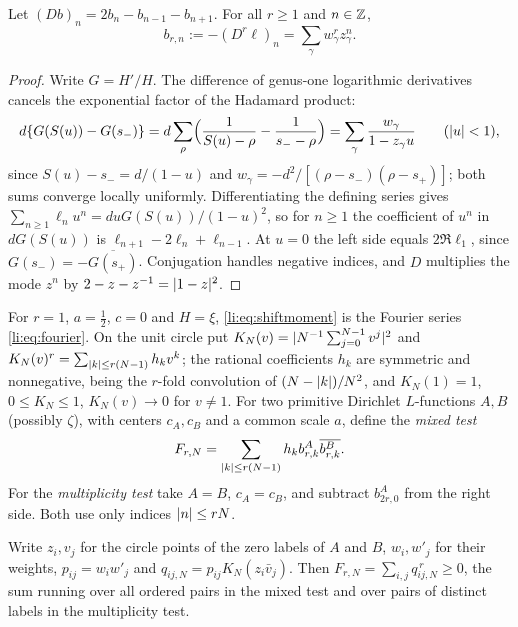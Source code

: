 \begin{lemma}\label{li:lem:shifted}
Let $(Db)_n=2b_n-b_{n-1}-b_{n+1}$. For all $r\ge1$ and $n\in\mathbb{Z}$,
\begin{equation}\label{li:eq:shiftmoment}
 b_{r,n}:=-(D^r\ell)_n=\sum_\gamma w_\gamma^rz_\gamma^n .
\end{equation}
\end{lemma}

\begin{proof}
Write $G=H'/H$. The difference of genus-one logarithmic derivatives cancels the exponential
factor of the Hadamard product:
\[
 d\{G(S(u))-G(s_-)\}=d\sum_\rho\Bigl(\frac1{S(u)-\rho}-\frac1{s_--\rho}\Bigr)
 =\sum_\gamma\frac{w_\gamma}{1-z_\gamma u}\qquad(\lvert u\rvert<1),
\]
since $S(u)-s_-=d/(1-u)$ and $w_\gamma=-d^2/[(\rho-s_-)(\rho-s_+)]$; both sums converge locally
uniformly. Differentiating the defining series gives $\sum_{n\ge1}\ell_nu^n=duG(S(u))/(1-u)^2$, so
for $n\ge1$ the coefficient of $u^n$ in $dG(S(u))$ is $\ell_{n+1}-2\ell_n+\ell_{n-1}$. At $u=0$ the
left side equals $2\Re\ell_1$, since $G(s_-)=-\overline{G(s_+)}$. Conjugation handles negative
indices, and $D$ multiplies the mode $z^n$ by $2-z-z^{-1}=\lvert1-z\rvert^2$.
\end{proof}

For $r=1$, $a=\frac12$, $c=0$ and $H=\xi$, \eqref{li:eq:shiftmoment} is the Fourier series
\eqref{li:eq:fourier}. On the unit circle put $K_N(v)=\lvert N^{-1}\sum_{j=0}^{N-1}v^j\rvert^2$ and
$K_N(v)^r=\sum_{\lvert k\rvert\le r(N-1)}h_kv^k$; the rational coefficients $h_k$ are symmetric and
nonnegative, being the $r$-fold convolution of $(N-\lvert k\rvert)/N^2$, and $K_N(1)=1$, $0\le K_N\le1$,
$K_N(v)\to0$ for $v\ne1$. For two primitive Dirichlet $L$-functions $A,B$ (possibly $\zeta$), with
centers $c_A,c_B$ and a common scale $a$, define the \emph{mixed test}
\begin{equation}\label{li:eq:F}
 F_{r,N}=\sum_{\lvert k\rvert\le r(N-1)}h_kb^A_{r,k}\overline{b^B_{r,k}} .
\end{equation}
For the \emph{multiplicity test} take $A=B$, $c_A=c_B$, and subtract $b^A_{2r,0}$ from the right
side. Both use only indices $\lvert n\rvert\le rN$.

\begin{lemma}\label{li:lem:pairs}
Write $z_i,v_j$ for the circle points of the zero labels of $A$ and $B$, $w_i,w'_j$ for their
weights, $p_{ij}=w_iw'_j$ and $q_{ij,N}=p_{ij}K_N(z_i\bar v_j)$. Then
$F_{r,N}=\sum_{i,j}q_{ij,N}^{\,r}\ge0$, the sum running over all ordered pairs in the mixed test
and over pairs of distinct labels in the multiplicity test.
\end{lemma}

